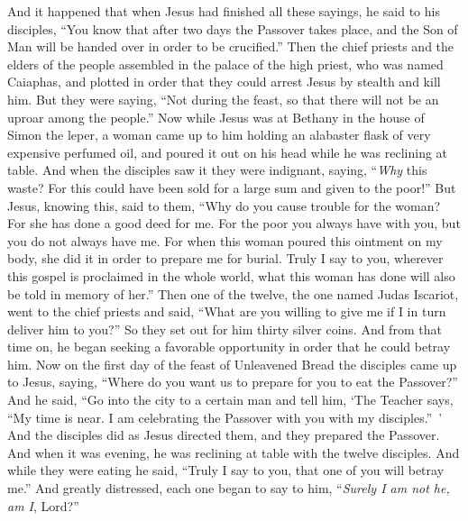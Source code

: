 \begin{biblechapter} %
 And it happened that when Jesus had finished all these sayings, he said to his disciples,
\verse “You know that after two days the Passover takes place, and the Son of Man will be handed over in order to be crucified.”
\verse Then the chief priests and the elders of the people assembled in the palace of the high priest, who was named Caiaphas,
\verse and plotted in order that they could arrest Jesus by stealth and kill him.
\verse But they were saying, “Not during the feast, so that there will not be an uproar among the people.”
 Now while Jesus was at Bethany in the house of Simon the leper,
\verse a woman came up to him holding an alabaster flask of very expensive perfumed oil, and poured it out on his head while he was reclining at table.
\verse And when the disciples saw it they were indignant, saying, “\textit{Why} this waste?
\verse For this could have been sold for a large sum and given to the poor!”
\verse But Jesus, knowing this, said to them, “Why do you cause trouble for the woman? For she has done a good deed for me.
\verse For the poor you always have with you, but you do not always have me.
\verse For when this woman poured this ointment on my body, she did it in order to prepare me for burial.
\verse Truly I say to you, wherever this gospel is proclaimed in the whole world, what this woman has done will also be told in memory of her.”
 Then one of the twelve, the one named Judas Iscariot, went to the chief priests
\verse and said, “What are you willing to give me if I in turn deliver him to you?” So they set out for him thirty silver coins.
\verse And from that time on, he began seeking a favorable opportunity in order that he could betray him.
 Now on the first day of the feast of Unleavened Bread the disciples came up to Jesus, saying, “Where do you want us to prepare for you to eat the Passover?”
\verse And he said, “Go into the city to a certain man and tell him, ‘The Teacher says, “My time is near. I am celebrating the Passover with you with my disciples.” ’
\verse And the disciples did as Jesus directed them, and they prepared the Passover.
\verse And when it was evening, he was reclining at table with the twelve disciples.
\verse And while they were eating he said, “Truly I say to you, that one of you will betray me.”
\verse And greatly distressed, each one began to say to him, “\textit{Surely I am not he, am I}, Lord?”

\end{biblechapter}
